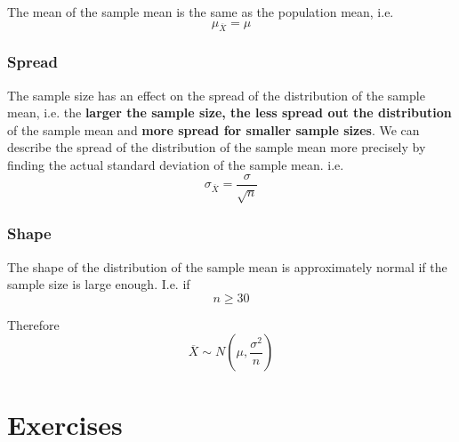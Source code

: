 \documentclass[12pt letter]{report}
\begin{document}
The mean of the sample mean is the same as the population mean, i.e.
\[
  \mu_{\overline{X}} = \mu
\]

\subsection{Spread}

The sample size has an effect on the spread of the distribution of the sample mean, i.e. the \textbf{larger the sample
  size, the less spread out the distribution} of the sample mean and \textbf{more spread for smaller sample sizes}. We can
describe the spread of the distribution of the sample mean more precisely by finding the actual standard deviation of the
sample mean. i.e.
\[
  \sigma_{\overline{X}} = \frac{\sigma}{\sqrt{n}}
\]

\subsection{Shape}

The shape of the distribution of the sample mean is approximately normal if the sample size is large enough. I.e. if
\[
  n \geq 30
\]

Therefore
\[
  \overline{X} \sim N \left( \mu, \frac{\sigma^2}{n} \right)
\]



\chapter{Exercises}

\end{document}
